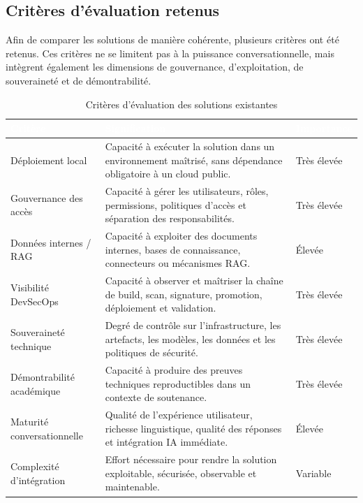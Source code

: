 \subsection{Critères d’évaluation retenus}

Afin de comparer les solutions de manière cohérente, plusieurs critères ont été retenus. Ces critères ne se limitent pas à la puissance conversationnelle, mais intègrent également les dimensions de gouvernance, d’exploitation, de souveraineté et de démontrabilité.

\begin{table}[htbp]
\centering
\renewcommand{\arraystretch}{1.35}
\small
\begin{tabularx}{\textwidth}{|p{3.4cm}|Y|p{2.6cm}|}
\hline
{}
\textcolor{white}{\textbf{Critère}} &
\textcolor{white}{\textbf{Signification}} &
\textcolor{white}{\textbf{Importance}} \\
\hline

Déploiement local &
Capacité à exécuter la solution dans un environnement maîtrisé, sans dépendance obligatoire à un cloud public. &
Très élevée \\
\hline

Gouvernance des accès &
Capacité à gérer les utilisateurs, rôles, permissions, politiques d’accès et séparation des responsabilités. &
Très élevée \\
\hline

Données internes / RAG &
Capacité à exploiter des documents internes, bases de connaissance, connecteurs ou mécanismes RAG. &
Élevée \\
\hline

Visibilité DevSecOps &
Capacité à observer et maîtriser la chaîne de build, scan, signature, promotion, déploiement et validation. &
Très élevée \\
\hline

Souveraineté technique &
Degré de contrôle sur l’infrastructure, les artefacts, les modèles, les données et les politiques de sécurité. &
Très élevée \\
\hline

Démontrabilité académique &
Capacité à produire des preuves techniques reproductibles dans un contexte de soutenance. &
Très élevée \\
\hline

Maturité conversationnelle &
Qualité de l’expérience utilisateur, richesse linguistique, qualité des réponses et intégration IA immédiate. &
Élevée \\
\hline

Complexité d’intégration &
Effort nécessaire pour rendre la solution exploitable, sécurisée, observable et maintenable. &
Variable \\
\hline

\end{tabularx}
\caption{Critères d’évaluation des solutions existantes}
\label{tab:criteres_evaluation_existant}
\end{table}

